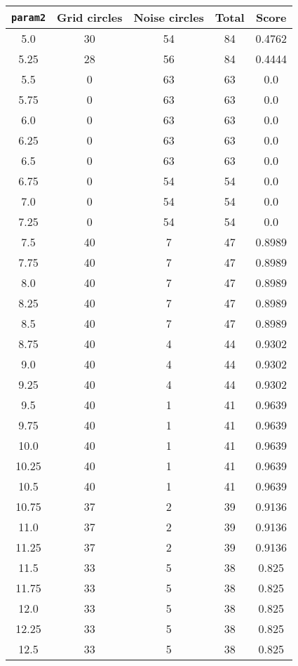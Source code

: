 \documentclass[letterpaper, 12pt]{article}
\begin{document}
\begin{longtable}{|c|c|c|c|c|}
\hline
\textbf{\texttt{param2}} & \textbf{Grid circles} & \textbf{Noise circles} & \textbf{Total} & \textbf{Score} \\
\hline
5.0 & 30 & 54 & 84 & 0.4762 \\
\hline
5.25 & 28 & 56 & 84 & 0.4444 \\
\hline
5.5 & 0 & 63 & 63 & 0.0 \\
\hline
5.75 & 0 & 63 & 63 & 0.0 \\
\hline
6.0 & 0 & 63 & 63 & 0.0 \\
\hline
6.25 & 0 & 63 & 63 & 0.0 \\
\hline
6.5 & 0 & 63 & 63 & 0.0 \\
\hline
6.75 & 0 & 54 & 54 & 0.0 \\
\hline
7.0 & 0 & 54 & 54 & 0.0 \\
\hline
7.25 & 0 & 54 & 54 & 0.0 \\
\hline
7.5 & 40 & 7 & 47 & 0.8989 \\
\hline
7.75 & 40 & 7 & 47 & 0.8989 \\
\hline
8.0 & 40 & 7 & 47 & 0.8989 \\
\hline
8.25 & 40 & 7 & 47 & 0.8989 \\
\hline
8.5 & 40 & 7 & 47 & 0.8989 \\
\hline
8.75 & 40 & 4 & 44 & 0.9302 \\
\hline
9.0 & 40 & 4 & 44 & 0.9302 \\
\hline
9.25 & 40 & 4 & 44 & 0.9302 \\
\hline
9.5 & 40 & 1 & 41 & 0.9639 \\
\hline
9.75 & 40 & 1 & 41 & 0.9639 \\
\hline
10.0 & 40 & 1 & 41 & 0.9639 \\
\hline
10.25 & 40 & 1 & 41 & 0.9639 \\
\hline
10.5 & 40 & 1 & 41 & 0.9639 \\
\hline
10.75 & 37 & 2 & 39 & 0.9136 \\
\hline
11.0 & 37 & 2 & 39 & 0.9136 \\
\hline
11.25 & 37 & 2 & 39 & 0.9136 \\
\hline
11.5 & 33 & 5 & 38 & 0.825 \\
\hline
11.75 & 33 & 5 & 38 & 0.825 \\
\hline
12.0 & 33 & 5 & 38 & 0.825 \\
\hline
12.25 & 33 & 5 & 38 & 0.825 \\
\hline
12.5 & 33 & 5 & 38 & 0.825 \\

\end{longtable}
\end{document}
